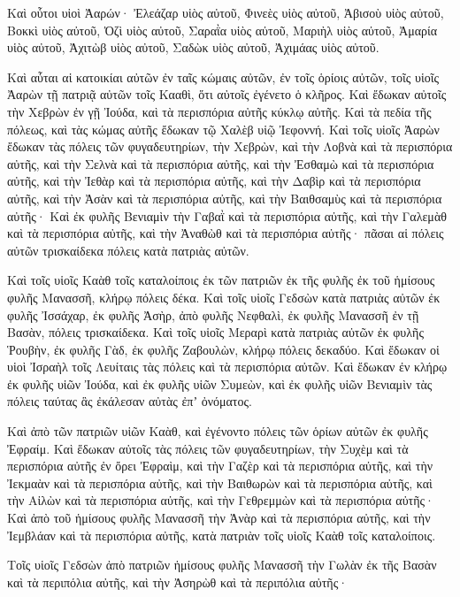 {Καὶ οὗτοι υἱοὶ Ἀαρών· Ἐλεάζαρ υἱὸς αὐτοῦ, Φινεὲς υἱὸς αὐτοῦ, Ἀβισοὺ υἱὸς αὐτοῦ,
Βοκκὶ υἱὸς αὐτοῦ, Ὀζὶ υἱὸς αὐτοῦ, Σαραῒα υἱὸς αὐτοῦ,
Μαριὴλ υἱὸς αὐτοῦ, Ἀμαρία υἱὸς αὐτοῦ, Ἀχιτὼβ υἱὸς αὐτοῦ,
Σαδὼκ υἱὸς αὐτοῦ, Ἀχιμάας υἱὸς αὐτοῦ.
\par }{\PP {}Καὶ αὗται αἱ κατοικίαι αὐτῶν ἐν ταῖς κώμαις αὐτῶν, ἐν τοῖς ὁρίοις αὐτῶν, τοῖς υἱοῖς Ἀαρὼν τῇ πατριᾷ αὐτῶν τοῖς Κααθὶ, ὅτι αὐτοῖς ἐγένετο ὁ κλῆρος.
Καὶ ἔδωκαν αὐτοῖς τὴν Χεβρὼν ἐν γῇ Ἰούδα, καὶ τὰ περισπόρια αὐτῆς κύκλῳ αὐτῆς.
Καὶ τὰ πεδία τῆς πόλεως, καὶ τὰς κώμας αὐτῆς ἔδωκαν τῷ Χαλὲβ υἱῷ Ἰεφοννή.
Καὶ τοῖς υἱοῖς Ἀαρὼν ἔδωκαν τὰς πόλεις τῶν φυγαδευτηρίων, τὴν Χεβρὼν, καὶ τὴν Λοβνὰ καὶ τὰ περισπόρια αὐτῆς, καὶ τὴν Σελνὰ καὶ τὰ περισπόρια αὐτῆς, καὶ τὴν Ἐσθαμὼ καὶ τὰ περισπόρια αὐτῆς,
καὶ τὴν Ἰεθὰρ καὶ τὰ περισπόρια αὐτῆς, καὶ τὴν Δαβὶρ καὶ τὰ περισπόρια αὐτῆς,
καὶ τὴν Ἀσὰν καὶ τὰ περισπόρια αὐτῆς, καὶ τὴν Βαιθσαμὺς καὶ τὰ περισπόρια αὐτῆς·
Καὶ ἐκ φυλῆς Βενιαμὶν τὴν Γαβαῒ καὶ τὰ περισπόρια αὐτῆς, καὶ τὴν Γαλεμὰθ καὶ τὰ περισπόρια αὐτῆς, καὶ τὴν Ἀναθὼθ καὶ τὰ περισπόρια αὐτῆς· πᾶσαι αἱ πόλεις αὐτῶν τρισκαίδεκα πόλεις κατὰ πατριὰς αὐτῶν.
\par }{\PP {}Καὶ τοῖς υἱοῖς Καὰθ τοῖς καταλοίποις ἐκ τῶν πατριῶν ἐκ τῆς φυλῆς ἐκ τοῦ ἡμίσους φυλῆς Μανασσῆ, κλήρῳ πόλεις δέκα.
Καὶ τοῖς υἱοῖς Γεδσὼν κατὰ πατριὰς αὐτῶν ἐκ φυλῆς Ἰσσάχαρ, ἐκ φυλῆς Ἀσὴρ, ἀπὸ φυλῆς Νεφθαλὶ, ἐκ φυλῆς Μανασσῆ ἐν τῇ Βασὰν, πόλεις τρισκαίδεκα.
Καὶ τοῖς υἱοῖς Μεραρὶ κατὰ πατριὰς αὐτῶν ἐκ φυλῆς Ῥουβὴν, ἐκ φυλῆς Γὰδ, ἐκ φυλῆς Ζαβουλὼν, κλήρῳ πόλεις δεκαδύο.
Καὶ ἔδωκαν οἱ υἱοὶ Ἰσραὴλ τοῖς Λευίταις τὰς πόλεις καὶ τὰ περισπόρια αὐτῶν.
Καὶ ἔδωκαν ἐν κλήρῳ ἐκ φυλῆς υἱῶν Ἰούδα, καὶ ἐκ φυλῆς υἱῶν Συμεὼν, καὶ ἐκ φυλῆς υἱῶν Βενιαμὶν τὰς πόλεις ταύτας ἃς ἐκάλεσαν αὐτὰς ἐπʼ ὀνόματος.
\par }{\PP {}Καὶ ἀπὸ τῶν πατριῶν υἱῶν Καὰθ, καὶ ἐγένοντο πόλεις τῶν ὁρίων αὐτῶν ἐκ φυλῆς Ἐφραίμ.
Καὶ ἔδωκαν αὐτοῖς τὰς πόλεις τῶν φυγαδευτηρίων, τὴν Συχὲμ καὶ τὰ περισπόρια αὐτῆς ἐν ὄρει Ἐφραὶμ, καὶ τὴν Γαζὲρ καὶ τὰ περισπόρια αὐτῆς,
καὶ τὴν Ἰεκμαὰν καὶ τὰ περισπόρια αὐτῆς, καὶ τὴν Βαιθωρὼν καὶ τὰ περισπόρια αὐτῆς,
καὶ τὴν Αἰλὼν καὶ τὰ περισπόρια αὐτῆς, καὶ τὴν Γεθρεμμὼν καὶ τὰ περισπόρια αὐτῆς·
Καὶ ἀπὸ τοῦ ἡμίσους φυλῆς Μανασσῆ τὴν Ἀνὰρ καὶ τὰ περισπόρια αὐτῆς, καὶ τὴν Ἰεμβλάαν καὶ τὰ περισπόρια αὐτῆς, κατὰ πατριὰν τοῖς υἱοῖς Καὰθ τοῖς καταλοίποις.
\par }{\PP {}Τοῖς υἱοῖς Γεδσὼν ἀπὸ πατριῶν ἡμίσους φυλῆς Μανασσῆ τὴν Γωλὰν ἐκ τῆς Βασὰν καὶ τὰ περιπόλια αὐτῆς, καὶ τὴν Ἀσηρὼθ καὶ τὰ περιπόλια αὐτῆς·
}
